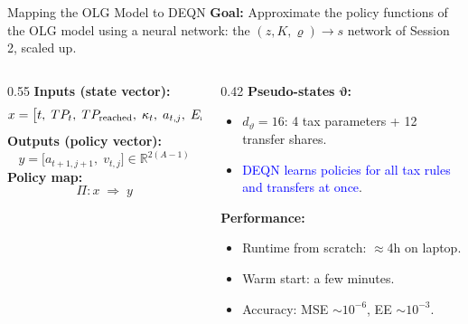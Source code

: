 \documentclass[10pt,aspectratio=169]{beamer}
\begin{document}
\begin{frame}[fragile]{Mapping the OLG Model to DEQN}
\noindent\textbf{Goal:} Approximate the policy functions of the OLG model using a neural network: the $(z, K, \varrho) \rightarrow s$ network of Session 2, scaled up.

\vspace{0.4cm}
\begin{columns}
\begin{column}{0.55\textwidth}
\textbf{Inputs (state vector):}
\[
x = \big[t,\; TP_t,\; TP_{\mathrm{reached}},\; \kappa_t,\; a_{t,j},\; E_t,\;
\textcolor{blue}{\vartheta}\big]
\in \mathbb{R}^{A + 5 + d_\vartheta}
\]
\textbf{Outputs (policy vector):}
\[
y = \big[a_{t+1,j+1},\; v_{t,j}\big]
\in \mathbb{R}^{2(A-1)}
\]
\textbf{Policy map:}
\[
\Pi: x \;\Rightarrow\; y
\]
\end{column}
\begin{column}{0.42\textwidth}
\textbf{Pseudo-states $\boldsymbol{\vartheta}$:}
\begin{itemize}
  \item $d_\vartheta = 16$: 4 tax parameters + 12 transfer shares.
  \item \textcolor{blue}{DEQN learns policies for all tax rules and transfers at once}.
\end{itemize}
\vspace{0.3cm}
\textbf{Performance:}
\begin{itemize}
  \item Runtime from scratch: $\approx$4h on laptop.
  \item Warm start: a few minutes.
  \item Accuracy: MSE $\sim 10^{-6}$,\newline
  EE $\sim 10^{-3}$.
\end{itemize}
\end{column}
\end{columns}
\end{frame}
\end{document}
